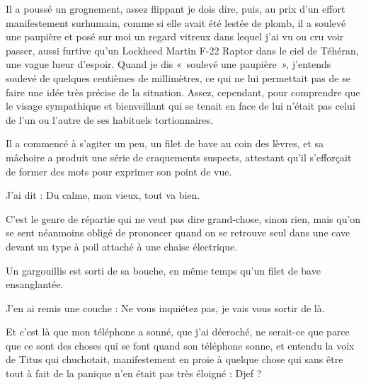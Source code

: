Il a poussé un grognement, assez flippant je dois dire, puis, au prix d’un effort manifestement surhumain, comme si elle avait été lestée de plomb, il a soulevé une paupière et posé sur moi un regard vitreux dans lequel j’ai vu ou cru voir passer, aussi furtive qu’un Lockheed Martin F-22 Raptor dans le ciel de Téhéran, une vague lueur d’espoir. Quand je dis «~soulevé une paupière~», j’entends soulevé de quelques centièmes de millimètres, ce qui ne lui permettait pas de se faire une idée très précise de la situation. Assez, cependant, pour comprendre que le visage sympathique et bienveillant qui se tenait en face de lui n’était pas celui de l’un ou l’autre de ses habituels tortionnaires.

Il a commencé à s’agiter un peu, un filet de bave au coin des lèvres, et sa mâchoire a produit une série de craquements suspects, attestant qu’il s’efforçait de former des mots pour exprimer son point de vue.

J’ai dit : Du calme, mon vieux, tout va bien.

C’est le genre de répartie qui ne veut pas dire grand-chose, sinon rien, mais qu’on se sent néanmoins obligé de prononcer quand on se retrouve seul dans une cave devant un type à poil attaché à une chaise électrique.

Un gargouillis est sorti de sa bouche, en même temps qu’un filet de bave ensanglantée.

J’en ai remis une couche : Ne vous inquiétez pas, je vais vous sortir de là.

Et c’est là que mon téléphone a sonné, que j’ai décroché, ne serait-ce que parce que ce sont des choses qui se font quand son téléphone sonne, et entendu la voix de Titus qui chuchotait, manifestement en proie à quelque chose qui sans être tout à fait de la panique n’en était pas très éloigné : Djef ?

